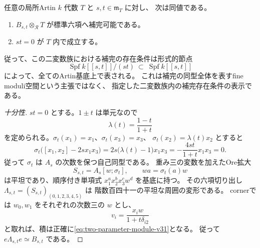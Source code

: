 \begin{theorem}[補完可能性を表す節点]
\label{thm:exact-node-completion-v31}
任意の局所Artin $k$ 代数 $T$ と $s,t\in\mathfrak m_T$ に対し、
次は同値である。
\begin{enumerate}
\item $B_{s,t}\otimes_{\mathscr R}T$ が標準六項へ補完可能である。
\item $st=0$ が $T$ 内で成立する。
\end{enumerate}
従って、この二変数族における補完の存在条件は形式的節点
\[
 \operatorname{Spf}k[[s,t]]/(st)
 \ \subset\ \operatorname{Spf}k[[s,t]]
\]
によって、全てのArtin基底上で表される。
これは補完の同型全体を表すfine moduli空間という主張ではなく、
指定した二変数族内の補完存在条件の表示である。
\end{theorem}

\begin{proof}[十分性]
$st=0$ とする。$1\pm t$ は単元なので
\[
 \lambda(t)=\frac{1-t}{1+t}
\]
を定められる。$\sigma_t(x_1)=x_1$、$\sigma_t(x_3)=x_3$、
$\sigma_t(x_2)=\lambda(t)x_2$ とすると
\[
 \sigma_t\bigl([x_1,x_2]-2s x_1x_3\bigr)
 =2s\bigl(\lambda(t)-1\bigr)x_1x_3
 =-\frac{4st}{1+t}x_1x_3=0.
\]
従って $\sigma_t$ は $A_s$ の次数を保つ自己同型である。
重み三の変数を加えたOre拡大
\[
 S_{s,t}=A_s[w;\sigma_t],\qquad wa=\sigma_t(a)w
\]
は平坦であり、順序付き単項式 $x_1^ax_2^bx_3^cw^d$ を基底に持つ。
その六項切り出し $\Lambda_{s,t}=(S_{s,t})_{(0,1,2,3,4,5)}$ は
階数百四十一の平坦な周囲の変形である。
cornerでは $w_0,w_1$ をそれぞれの次数三の $w$ とし、
\[
 v_i=\frac{x_iw}{1+t\delta_{i2}}
\]
と取れば、積は正確に\eqref{eq:two-parameter-module-v31}となる。
従って $e\Lambda_{s,t}e\simeq B_{s,t}$ である。
\end{proof}

